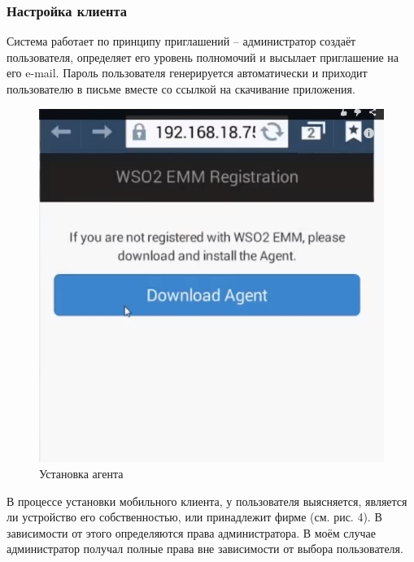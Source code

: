 \documentclass[a4paper, 12pt]{article}		%
\begin{document}
\subsubsection{Настройка клиента}

Система работает по принципу приглашений -- администратор создаёт пользователя, определяет его уровень полномочий и высылает приглашение на его e-mail. Пароль пользователя генерируется автоматически и приходит пользователю в письме вместе со ссылкой на скачивание приложения.

\begin{figure}[h!]
\centering
\includegraphics[scale=0.45]{res/EMM003}
\caption{Установка агента}
\end{figure}

В процессе установки мобильного клиента, у пользователя выясняется, является ли устройство его собственностью, или принадлежит фирме (см. рис. 4). В зависимости от этого определяются права администратора. В моём случае администратор получал полные права вне зависимости от выбора пользователя.
\end{document}

